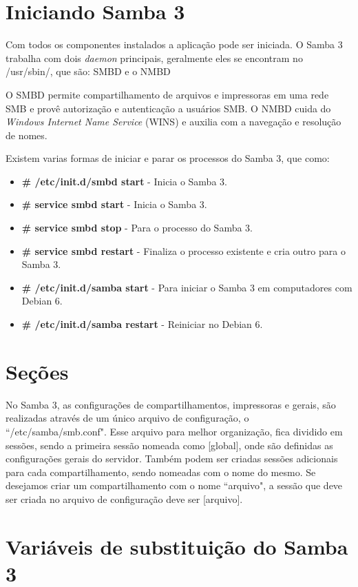 \section{Iniciando Samba 3}

Com todos os componentes instalados a aplicação pode ser iniciada. O Samba 3 trabalha com dois \textit{daemon} principais, geralmente eles se encontram no /usr/sbin/,  que são: SMBD e o NMBD

O SMBD permite compartilhamento de arquivos e impressoras em uma rede SMB e provê autorização e autenticação a usuários SMB. O NMBD cuida do \textit{Windows Internet Name Service} (WINS) e auxilia com a navegação e resolução de nomes.\cite{SAMBA}

Existem varias formas de iniciar e parar os processos do Samba 3, que como:
\begin{itemize}
	\item \textbf{\# /etc/init.d/smbd start} - Inicia o Samba 3. 
	\item \textbf{\# service smbd start} - Inicia o Samba 3.
	\item \textbf{\# service smbd stop} - Para o processo do Samba 3.
	\item \textbf{\# service smbd restart} - Finaliza o processo existente e cria outro para o Samba 3.
	\item \textbf{\# /etc/init.d/samba start} - Para iniciar o Samba 3 em computadores com Debian 6.
	\item \textbf{\# /etc/init.d/samba restart} - Reiniciar no Debian 6.
\end{itemize}

\section{Seções}

No Samba 3, as configurações de compartilhamentos, impressoras e gerais, são realizadas através de um único arquivo de configuração, o ``/etc/samba/smb.conf". Esse arquivo para melhor organização, fica dividido em sessões, sendo a primeira sessão nomeada como [global], onde são definidas as configurações gerais do servidor. Também podem ser criadas sessões adicionais para cada compartilhamento, sendo nomeadas com o nome do mesmo. Se desejamos criar um compartilhamento com o nome ``arquivo", a sessão que deve ser criada no arquivo de configuração deve ser [arquivo].

\section{Variáveis de substituição do Samba 3}


